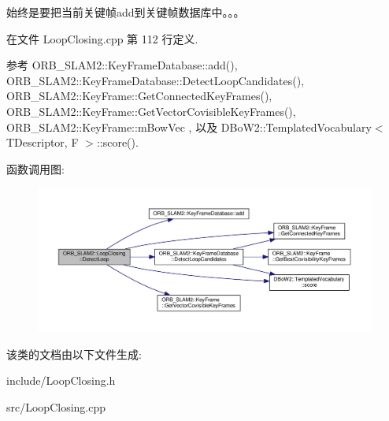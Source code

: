 始终是要把当前关键帧add到关键帧数据库中。。。 

在文件 Loop\-Closing.\-cpp 第 112 行定义.



参考 O\-R\-B\-\_\-\-S\-L\-A\-M2\-::\-Key\-Frame\-Database\-::add(), O\-R\-B\-\_\-\-S\-L\-A\-M2\-::\-Key\-Frame\-Database\-::\-Detect\-Loop\-Candidates(), O\-R\-B\-\_\-\-S\-L\-A\-M2\-::\-Key\-Frame\-::\-Get\-Connected\-Key\-Frames(), O\-R\-B\-\_\-\-S\-L\-A\-M2\-::\-Key\-Frame\-::\-Get\-Vector\-Covisible\-Key\-Frames(), O\-R\-B\-\_\-\-S\-L\-A\-M2\-::\-Key\-Frame\-::m\-Bow\-Vec , 以及 D\-Bo\-W2\-::\-Templated\-Vocabulary$<$ T\-Descriptor, F $>$\-::score().



函数调用图\-:
\nopagebreak
\begin{figure}[H]
\begin{center}
\leavevmode
\includegraphics[width=350pt]{classORB__SLAM2_1_1LoopClosing_aa8110ca79cebaf509e378d30e55f1381_cgraph}
\end{center}
\end{figure}




该类的文档由以下文件生成\-:\begin{DoxyCompactItemize}
\item 
include/Loop\-Closing.\-h\item 
src/Loop\-Closing.\-cpp\end{DoxyCompactItemize}
